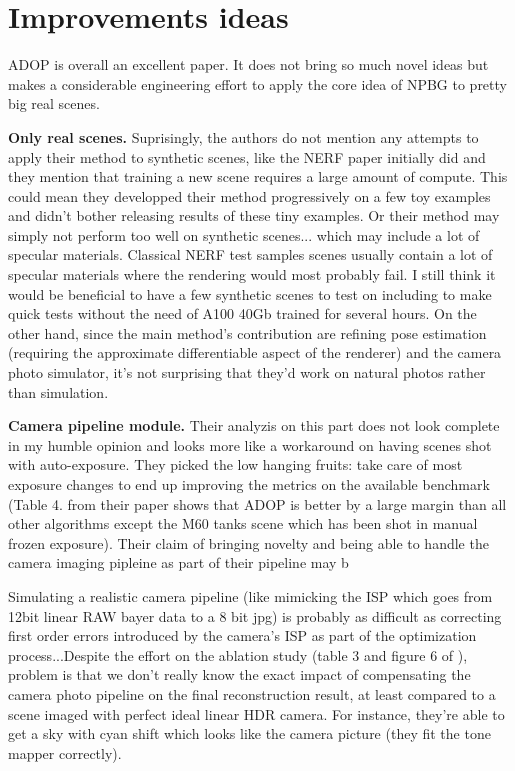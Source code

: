 \section{Improvements ideas}
\label{sec:discussion}
ADOP\cite{ruckert2022adop} is overall an excellent paper. It does not bring so much novel ideas but makes a considerable engineering effort to apply the core idea of NPBG \cite{Aliev2020} to pretty big real scenes.

\noindent \textbf{Only real scenes.}
Suprisingly, the authors do not mention any attempts to apply their method to synthetic scenes, like the NERF paper initially did and they mention that training a new scene requires a large amount of compute. This could mean they developped their method progressively on a few toy examples and didn't bother releasing results of these tiny examples. Or their method may simply not perform too well on synthetic scenes... which may include a lot of specular materials. Classical NERF test samples scenes usually contain a lot of specular materials where the rendering would most probably fail. I still think it would be beneficial to have a few synthetic scenes to test on including to make quick tests without the need of A100 40Gb trained for several hours.
On the other hand, since the main method's contribution are refining pose estimation (requiring the approximate differentiable aspect of the renderer) and the camera photo simulator, it's not surprising that they'd work on natural photos rather than simulation. 

\noindent \textbf{Camera pipeline module.} 
Their analyzis on this part does not look complete in my humble opinion and looks more like a workaround on having scenes shot with auto-exposure. They picked the low hanging fruits: take care of most exposure changes to end up improving the metrics on the available benchmark (Table 4. from their paper shows that ADOP is better by a large margin than all other algorithms except the M60 tanks scene which has been shot in manual frozen exposure). Their claim of bringing novelty and being able to handle the camera imaging pipleine as part of their pipeline may b 

Simulating a realistic camera pipeline (like mimicking the ISP which goes from 12bit linear RAW bayer data to a 8 bit jpg) is probably as difficult as correcting first order errors introduced by the camera's ISP as part of the optimization process...Despite the effort on the ablation study (table 3 and figure 6 of \cite{ruckert2022adop}), problem is that we don't really know the exact impact of compensating the camera photo pipeline on the final reconstruction result, at least compared to a scene imaged with perfect ideal linear HDR camera. For instance, they're able to get a sky with cyan shift which looks like the camera picture (they fit the tone mapper correctly).

